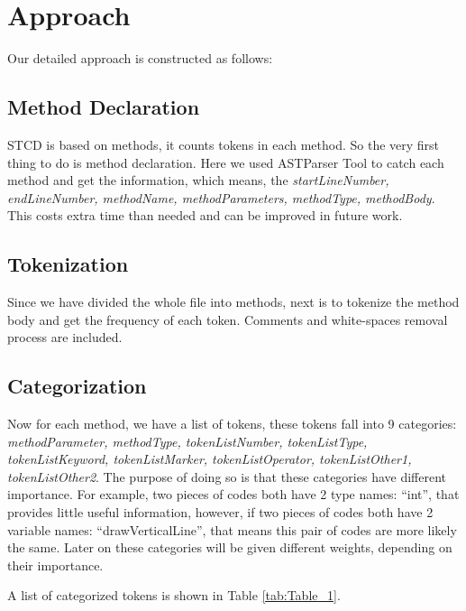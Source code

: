 \documentclass[../main.tex]{subfiles}
\begin{document}
\section{Approach}

Our detailed approach is constructed as follows:

\subsection{Method Declaration}

STCD is based on methods, it counts tokens in each method. So the very first thing to do is method declaration. Here we used ASTParser Tool to catch each method and get the information, which means, the \textit{startLineNumber, endLineNumber, methodName, methodParameters, methodType, methodBody}. This costs extra time than needed and can be improved in future work.

\subsection{Tokenization}

Since we have divided the whole file into methods, next is to tokenize the method body and get the frequency of each token. Comments and white-spaces removal process are included.

\subsection{Categorization}

Now for each method, we have a list of tokens, these tokens fall into 9 categories: \textit{methodParameter, methodType, tokenListNumber, tokenListType, tokenListKeyword, tokenListMarker, tokenListOperator, tokenListOther1, tokenListOther2}. The purpose of doing so is that these categories have different importance. For example, two pieces of codes both have 2 type names: ``int'', that provides little useful information, however, if two pieces of codes both have 2 variable names: ``drawVerticalLine'', that means this pair of codes are more likely the same. Later on these categories will be given different weights, depending on their importance.

A list of categorized tokens is shown in Table \ref{tab:Table_1}.
\end{document}
